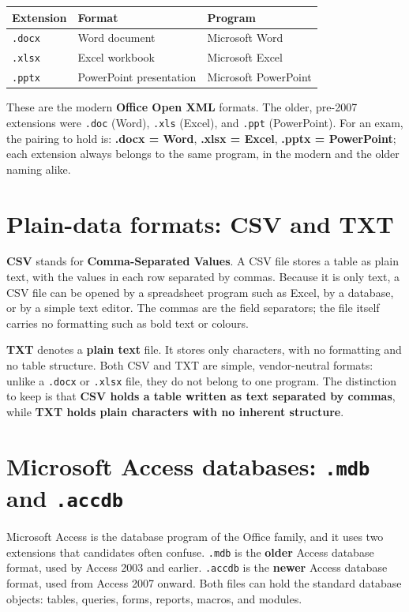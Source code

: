 \begin{center}
\begin{tabular}{p{}p{}p{}}
\toprule
\textbf{Extension} & \textbf{Format} & \textbf{Program} \\
\midrule
\texttt{.docx} & Word document & Microsoft Word \\
\texttt{.xlsx} & Excel workbook & Microsoft Excel \\
\texttt{.pptx} & PowerPoint presentation & Microsoft PowerPoint \\
\bottomrule
\end{tabular}
\end{center}

These are the modern \textbf{Office Open XML} formats. The older, pre-2007
extensions were \texttt{.doc} (Word), \texttt{.xls} (Excel), and \texttt{.ppt}
(PowerPoint). For an exam, the pairing to hold is: \textbf{.docx = Word},
\textbf{.xlsx = Excel}, \textbf{.pptx = PowerPoint}; each extension always
belongs to the same program, in the modern and the older naming alike.

\section{Plain-data formats: CSV and TXT}
\textbf{CSV} stands for \textbf{Comma-Separated Values}. A CSV file stores a
table as plain text, with the values in each row separated by commas. Because
it is only text, a CSV file can be opened by a spreadsheet program such as
Excel, by a database, or by a simple text editor. The commas are the field
separators; the file itself carries no formatting such as bold text or
colours.

\textbf{TXT} denotes a \textbf{plain text} file. It stores only characters,
with no formatting and no table structure. Both CSV and TXT are simple,
vendor-neutral formats: unlike a \texttt{.docx} or \texttt{.xlsx} file, they
do not belong to one program. The distinction to keep is that \textbf{CSV
holds a table written as text separated by commas}, while \textbf{TXT holds
plain characters with no inherent structure}.

\section{Microsoft Access databases: \texttt{.mdb} and \texttt{.accdb}}
Microsoft Access is the database program of the Office family, and it uses
two extensions that candidates often confuse. \texttt{.mdb} is the
\textbf{older} Access database format, used by Access 2003 and earlier.
\texttt{.accdb} is the \textbf{newer} Access database format, used from
Access 2007 onward. Both files can hold the standard database objects:
tables, queries, forms, reports, macros, and modules.

